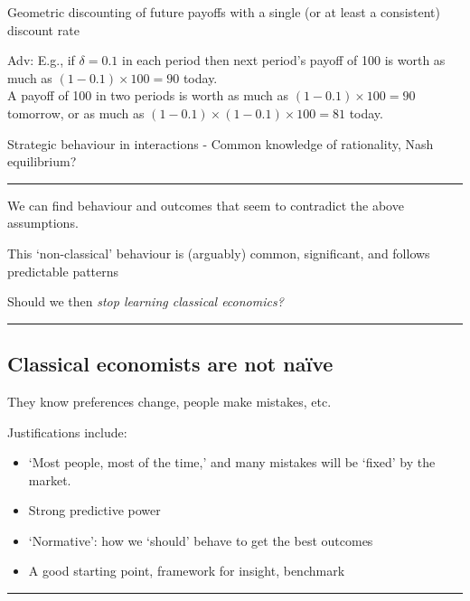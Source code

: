 \documentclass[]{article}
\providecommand{\tightlist}{%
  \setlength{\itemsep}{0pt}\setlength{\parskip}{0pt}}
\begin{document}
\bigskip

Geometric discounting of future payoffs with a single (or at least a consistent) discount rate

Adv: E.g., if \(\delta=0.1\) in each period then next period's payoff of 100 is worth as much as \((1-0.1) \times 100 = 90\) today.\\
A payoff of 100 in two periods is worth as much as \((1-0.1) \times 100 = 90\) tomorrow, or as much as \((1-0.1) \times (1-0.1)\times 100 = 81\) today.

\bigskip

Strategic behaviour in interactions
- Common knowledge of rationality, Nash equilibrium?

\begin{center}\rule{0.5\linewidth}{\linethickness}\end{center}

We can find behaviour and outcomes that seem to contradict the above assumptions.

This `non-classical' behaviour is (arguably) common, significant, and follows predictable patterns

Should we then \emph{stop learning classical economics?}

\begin{center}\rule{0.5\linewidth}{\linethickness}\end{center}

\hypertarget{classical-economists-are-not-naive}{%
\subsection{Classical economists are not naïve}\label{classical-economists-are-not-naive}}

They know preferences change, people make mistakes, etc.

Justifications include:

\begin{itemize}
\tightlist
\item
  `Most people, most of the time,' and many mistakes will be `fixed' by the market.
\item
  Strong predictive power
\item
  `Normative': how we `should' behave to get the best outcomes
\item
  A good starting point, framework for insight, benchmark
\end{itemize}

\begin{center}\rule{0.5\linewidth}{\linethickness}\end{center}
\end{document}
